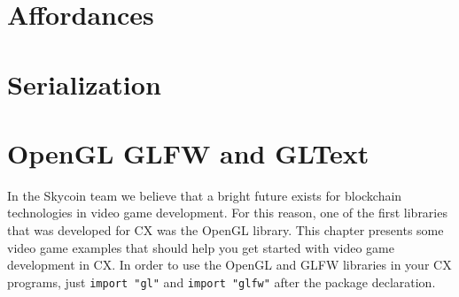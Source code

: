 \documentclass[11pt,fleqn,openany]{book} %
\begin{document}
\section{Affordances}
\label{section:library-aff}

\section{Serialization}
\label{section:library-serial}

\section{OpenGL GLFW and GLText}
\label{section:library-opengl}


In the Skycoin team we believe that a bright future exists for blockchain technologies in video game development. For this reason, one of the first libraries that was developed for CX was the OpenGL library. This chapter presents some video game examples that should help you get started with video game development in CX. In order to use the OpenGL and GLFW libraries in your CX programs, just \lstinline{import "gl"} and \lstinline{import "glfw"} after the package declaration.
\end{document}
